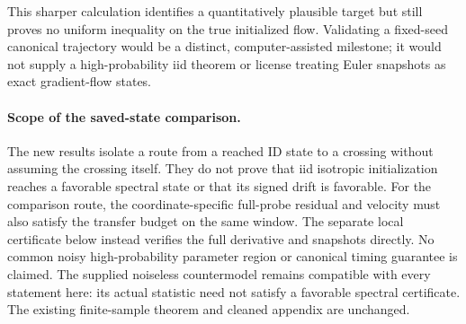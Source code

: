 \documentclass[10pt]{article}
\begin{document}
This sharper calculation identifies a quantitatively plausible target but
still proves no uniform inequality on the true initialized flow. Validating a
fixed-seed canonical trajectory would be a distinct, computer-assisted milestone;
it would not supply a high-probability iid theorem or license treating Euler
snapshots as exact gradient-flow states.

\paragraph{Scope of the saved-state comparison.}
The new results isolate a route from a reached ID state to a crossing without
assuming the crossing itself. They do not prove that iid isotropic initialization
reaches a favorable spectral state or that its signed drift is favorable.
For the comparison route, the coordinate-specific full-probe residual and velocity
must also satisfy the transfer budget on the same window. The separate local
certificate below instead verifies the full derivative and snapshots directly. No common noisy
high-probability parameter region or canonical timing guarantee is claimed.
The supplied noiseless countermodel remains compatible with every statement
here: its actual statistic need not satisfy a favorable spectral certificate.
The existing finite-sample theorem and cleaned appendix are unchanged.



\end{document}
